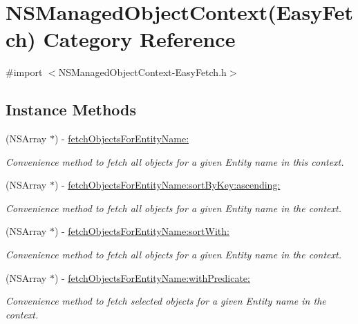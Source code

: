 \hypertarget{category_n_s_managed_object_context_07_easy_fetch_08}{\section{N\-S\-Managed\-Object\-Context(Easy\-Fetch) Category Reference}
\label{category_n_s_managed_object_context_07_easy_fetch_08}
}


{\ttfamily \#import $<$N\-S\-Managed\-Object\-Context-\/\-Easy\-Fetch.\-h$>$}

\subsection*{Instance Methods}
\begin{DoxyCompactItemize}
\item 
(N\-S\-Array $\ast$) -\/ \hyperlink{category_n_s_managed_object_context_07_easy_fetch_08_a646d8d8e52edf04aee25836610cea496}{fetch\-Objects\-For\-Entity\-Name\-:}
\begin{DoxyCompactList}\small\item\em Convenience method to fetch all objects for a given Entity name in this context. \end{DoxyCompactList}\item 
(N\-S\-Array $\ast$) -\/ \hyperlink{category_n_s_managed_object_context_07_easy_fetch_08_af803b63b20046f2de1197e12e63ead20}{fetch\-Objects\-For\-Entity\-Name\-:sort\-By\-Key\-:ascending\-:}
\begin{DoxyCompactList}\small\item\em Convenience method to fetch all objects for a given Entity name in the context. \end{DoxyCompactList}\item 
(N\-S\-Array $\ast$) -\/ \hyperlink{category_n_s_managed_object_context_07_easy_fetch_08_a6350a763854bdbed0f1ac4397a435026}{fetch\-Objects\-For\-Entity\-Name\-:sort\-With\-:}
\begin{DoxyCompactList}\small\item\em Convenience method to fetch all objects for a given Entity name in the context. \end{DoxyCompactList}\item 
(N\-S\-Array $\ast$) -\/ \hyperlink{category_n_s_managed_object_context_07_easy_fetch_08_ae843f9f82ecfc5e31897b7577ef55ccd}{fetch\-Objects\-For\-Entity\-Name\-:with\-Predicate\-:}
\begin{DoxyCompactList}\small\item\em Convenience method to fetch selected objects for a given Entity name in the context. \end{DoxyCompactList}\item 

\end{DoxyCompactItemize}
